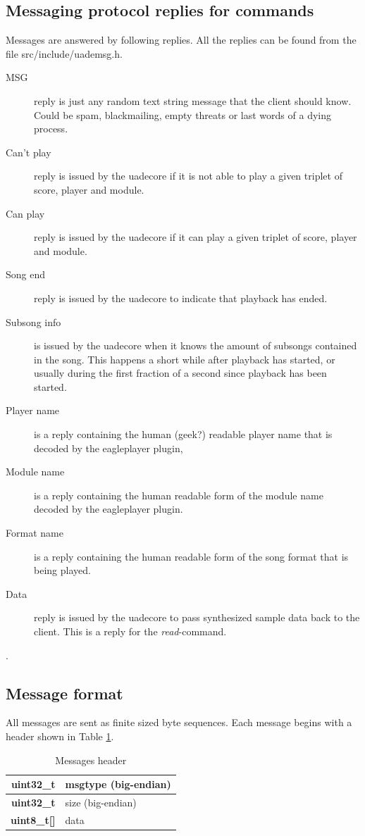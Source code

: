 \documentclass{article}
\begin{document}
\subsection{Messaging protocol replies for commands}

Messages are answered by following replies.
All the replies can be found from the file \mbox{src/include/uademsg.h}.

\begin{description}
\item [MSG] reply is just any random text string message that the client should
know. Could be spam, blackmailing, empty threats or last words of a dying
process.
\item [Can't play] reply is issued by the uadecore if it is not able to play
a given triplet of score, player and module.
\item [Can play] reply is issued by the uadecore if it can play a given
triplet of score, player and module.
\item [Song end] reply is issued by the uadecore to indicate that playback
has ended.
\item [Subsong info] is issued by the uadecore when it knows the amount of
subsongs contained in the song. This happens a short while after playback
has started, or usually during the first fraction of a second since
playback has been started.
\item [Player name] is a reply containing the human (geek?) readable player
name that is decoded by the eagleplayer plugin,
\item [Module name] is a reply containing the human readable form of the
module name decoded by the eagleplayer plugin.
\item [Format name] is a reply containing the human readable form
of the song format that is being played.
\item [Data] reply is issued by the uadecore to pass synthesized sample
data back to the client. This is a reply for the \emph{read}-command.
\end{description}.

\subsection{Message format}
All messages are sent as finite sized byte sequences. Each message begins
with a header shown in Table \ref{tab:message_header}.

\begin{table}
\begin{center}
\caption{Messages header}
\label{tab:message_header}
\begin{tabular}{|r|l|}
\hline
\textbf{uint32\_t} & msgtype (big-endian) \\
\hline
\textbf{uint32\_t} & size (big-endian)\\
\hline
\textbf{uint8\_t[]} & data \\
\hline
\end{tabular}
\end{center}
\end{table}
\end{document}
